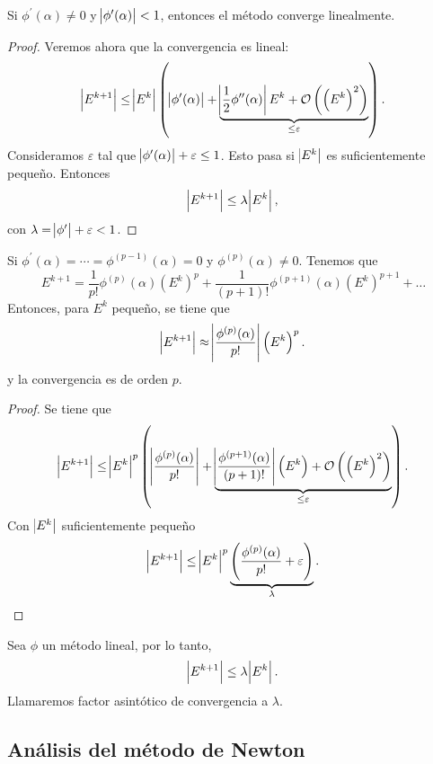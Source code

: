 \begin{prop}
    Si $\phi^\prime(\alpha) \neq 0$ y $\abs{\phi^\prime(\alpha)} < 1$, entonces el método converge linealmente.
\end{prop}

\begin{proof}
    Veremos ahora que la convergencia es lineal:
    \[
        \abs{E^{k+1}} \leq \abs{E^k} \left( \abs{\phi^\prime(\alpha)} + 
            \underbrace{\abs{\frac{1}{2} \phi^{\prime \prime}(\alpha)} E^k +
            \mathcal{O}\left( \left( E^k \right)^2 \right)}_{\leq \varepsilon} \right).
    \]
    Consideramos $\varepsilon$ tal que $\abs{\phi^\prime(\alpha)} + \varepsilon \leq 1$. Esto pasa
    si $\abs{E^k}$ es suficientemente pequeño. Entonces
    \[
        \abs{E^{k+1}} \leq \lambda \abs{E^k},
    \]
    con $\lambda = \abs{\phi^\prime} + \varepsilon < 1$.
\end{proof}

\begin{prop}
    Si $\phi^\prime(\alpha) = \cdots = \phi^{(p-1)}(\alpha) = 0$ y $\phi^{(p)}(\alpha) \neq 0$. Tenemos que
    \[
        E^{k+1} = \frac{1}{p!}\phi^{(p)}(\alpha) \left( E^k \right)^p +
        \frac{1}{(p+1)!} \phi^{(p+1)}(\alpha) \left( E^k \right)^{p+1} + \dots
    \]
    Entonces, para $E^k$ pequeño, se tiene que
    \[
        \abs{E^{k+1}} \approx \abs{\frac{\phi^{(p)}(\alpha)}{p!}} \left( E^k \right)^p.
    \]
    y la convergencia es de orden $p$.
\end{prop}

\begin{proof}
    Se tiene que
    \[
        \abs{E^{k+1}} \leq \abs{E^k}^p \left( \abs{\frac{\phi^{(p)}(\alpha)}{p!}} +
        \underbrace{\abs{\frac{\phi^{(p+1)}(\alpha)}{(p+1)!}} \left( E^k \right) +
        \mathcal{O}\left( \left( E^k \right)^2 \right)}_{\leq \varepsilon} \right).
    \]
    Con $\abs{E^k}$ suficientemente pequeño
    \[
        \abs{E^{k+1}} \leq \abs{E^k}^p
        \underbrace{\left( \frac{\phi^{(p)}(\alpha)}{p!} + \varepsilon  \right)}_{\lambda}.
    \]
\end{proof}

\begin{defi}
    Sea $\phi$ un método lineal, por lo tanto,
    \[
        \abs{E^{k+1}} \leq \lambda \abs{E^k}.
    \]
    Llamaremos factor asintótico de convergencia a $\lambda$.
\end{defi}

\subsection{Análisis del método de Newton}

